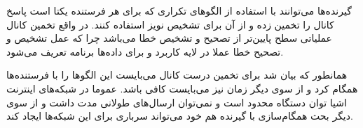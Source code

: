 
گیرنده‌ها می‌توانند با استفاده از الگو‌های تکراری که برای هر فرستنده یکتا است پاسخ کانال را تخمین زده و از آن
برای تشخیص نویز استفاده کنند.
در واقع تخمین کانال عملیاتی سطح پایین‌تر از تصحیح و تشخیص خطا می‌باشد چرا که عمل تشخیص و تصحیح خطا
عملا در لایه کاربرد و برای داده‌ها برنامه تعریف می‌شود.

همانطور که بیان شد برای تخمین درست کانال می‌بایست این الگوها را با فرستنده‌ها همگام کرد و از سوی دیگر زمان نیز
می‌بایست کافی باشد. عموما در شبکه‌های اینترنت اشیا توان دستگاه محدود است و نمی‌توان ارسال‌های طولانی مدت داشت
و از سوی دیگر بحث همگام‌سازی با گیرنده هم خود می‌تواند سرباری برای این شبکه‌ها ایجاد کند.
